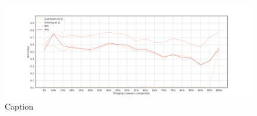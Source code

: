 \begin{figure}[!htb]
    \centering
    \includegraphics[width=\textwidth]{gfx/stability/bpic2015_3/windowed_stability.png}
    \caption{Caption}
    \label{fig:my_label}
\end{figure}